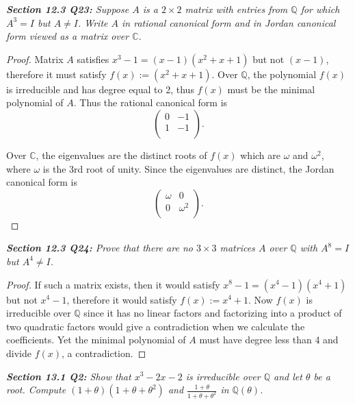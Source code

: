 \documentclass{article}
\begin{document}
\it \textbf{Section 12.3 Q23:} Suppose $A$ is a $2\times2$ matrix with
  entries from $\mathbb{Q}$ for which $A^3=I$ but $A\neq I$. Write $A$ in
  rational canonical form and in Jordan canonical form viewed as a matrix
  over $\mathbb{C}$.

  \begin{proof}
    Matrix $A$ satisfies $x^3-1=(x-1)(x^2+x+1)$ but not $(x-1)$, therefore
    it must satisfy $f(x):=(x^2+x+1)$. Over $\mathbb{Q}$, the polynomial
    $f(x)$ is irreducible and has degree equal to 2, thus $f(x)$ must be the
    minimal polynomial of $A$. Thus the rational canonical form is
    \[\begin{pmatrix} 0&-1\\ 1&-1\\ \end{pmatrix}.\]

    Over $\mathbb{C}$, the eigenvalues are the distinct roots of $f(x)$
    which are $\omega$ and $\omega^2$, where $\omega$ is the 3rd root of
    unity. Since the eigenvalues are distinct, the Jordan canonical form
    is
    \[\begin{pmatrix} \omega&0\\ 0&\omega^2\\ \end{pmatrix}.\]
  \end{proof}

\it \textbf{Section 12.3 Q24:} Prove that there are no $3\times3$ matrices
  $A$ over $\mathbb{Q}$ with $A^8=I$ but $A^4\neq I$. 

  \begin{proof}
    If such a matrix exists, then it would satisfy $x^8-1=(x^4-1)(x^4+1)$
    but not $x^4-1$, therefore it would satisfy $f(x):=x^4+1$. Now
    $f(x)$ is irreducible over $\mathbb{Q}$ since it has no linear factors
    and factorizing into a product of two quadratic factors would give a
    contradiction when we calculate the coefficients. Yet the minimal
    polynomial of $A$ must have degree less than 4 and divide $f(x)$, a
    contradiction.
  \end{proof}

\it \textbf{Section 13.1 Q2:} Show that $x^3-2x-2$ is irreducible over
  $\mathbb{Q}$ and let $\theta$ be a root. Compute
  $(1+\theta)(1+\theta+\theta^2)$ and $\frac{1+\theta}{1+\theta+\theta^2}$
  in $\mathbb{Q}(\theta)$.
\end{document}
